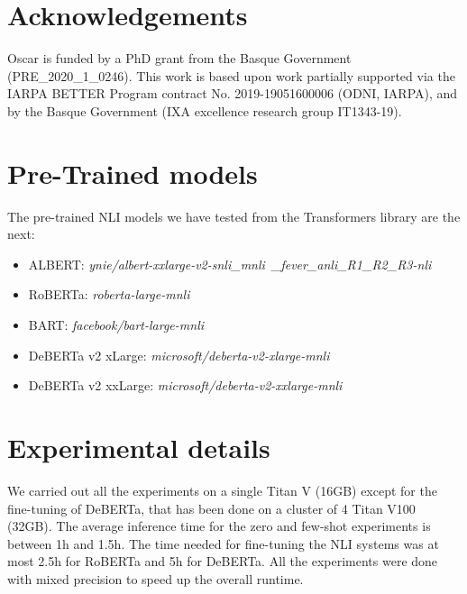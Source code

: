 \documentclass[11pt]{article}
\begin{document}
\section*{Acknowledgements}
Oscar is funded by a PhD grant from the Basque Government (PRE\_2020\_1\_0246). This work is based upon work partially supported via the IARPA  BETTER Program contract No. 2019-19051600006 (ODNI, IARPA), and by the Basque Government (IXA excellence research group IT1343-19). 















\clearpage


\appendix

\setcounter{table}{0}

\section{Pre-Trained models}
\label{sec:pretrained}

The pre-trained NLI models we have tested from the Transformers library are the next:
\begin{itemize}
    \item ALBERT: \textit{ynie/albert-xxlarge-v2-snli\_mnli\ \_fever\_anli\_R1\_R2\_R3-nli}
    \item RoBERTa: \textit{roberta-large-mnli}
    \item BART: \textit{facebook/bart-large-mnli}
\item DeBERTa v2 xLarge: \textit{microsoft/deberta-v2-xlarge-mnli}
    \item DeBERTa v2 xxLarge: \textit{microsoft/deberta-v2-xxlarge-mnli}
\end{itemize}

\section{Experimental details}
\label{sec:experimental_details}

We carried out all the experiments on a single Titan V (16GB) except for the fine-tuning of DeBERTa, that has been done on a cluster of 4 Titan V100 (32GB). The average inference time for the zero and few-shot experiments is between 1h and 1.5h. The time needed for fine-tuning the NLI systems was at most 2.5h for RoBERTa and 5h for DeBERTa. All the experiments were done with mixed precision to speed up the overall runtime.
\end{document}
